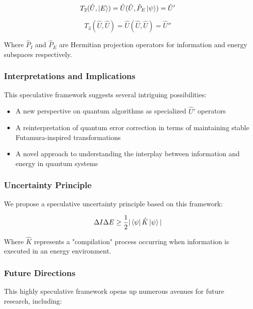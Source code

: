\begin{equation}
    T_2(\hat{U}, \ket{E}) = \hat{U}(\hat{U}, \hat{P}_E\ket{\psi}) = \hat{U}'
\end{equation}

\begin{equation}
    T_3(\hat{U}, \hat{U}) = \hat{U}(\hat{U}, \hat{U}) = \hat{U}''
\end{equation}

Where $\hat{P}_I$ and $\hat{P}_E$ are Hermitian projection operators for information and energy subspaces respectively.

\subsubsection{Interpretations and Implications}

This speculative framework suggests several intriguing possibilities:

\begin{itemize}
    \item A new perspective on quantum algorithms as specialized $\hat{U}'$ operators
    \item A reinterpretation of quantum error correction in terms of maintaining stable Futamura-inspired transformations
    \item A novel approach to understanding the interplay between information and energy in quantum systems
\end{itemize}

\subsubsection{Uncertainty Principle}

We propose a speculative uncertainty principle based on this framework:

\begin{equation}
    \Delta I \Delta E \geq \frac{1}{2}|\bra{\psi}\hat{K}\ket{\psi}|
\end{equation}

Where $\hat{K}$ represents a "compilation" process occurring when information is executed in an energy environment.

\subsubsection{Future Directions}

This highly speculative framework opens up numerous avenues for future research, including:

